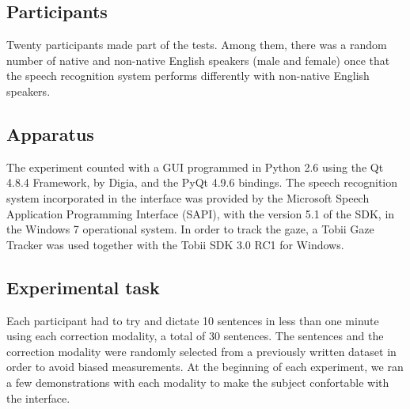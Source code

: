 \documentclass[]{article}
\begin{document}
\subsection{Participants}
Twenty participants made part of the tests. Among them, there was a random number of native and non-native English speakers (male and female) once that the speech recognition system performs differently with non-native English speakers.


\subsection{Apparatus}
The experiment counted with a GUI programmed in Python 2.6 using the Qt 4.8.4 Framework, by Digia, and the PyQt 4.9.6 bindings. The speech recognition system incorporated in the interface was provided by the Microsoft Speech Application Programming Interface (SAPI), with the version 5.1 of the SDK, in the Windows 7 operational system. In order to track the gaze, a Tobii Gaze Tracker was used together with the Tobii SDK 3.0 RC1 for Windows.


\subsection{Experimental task}
Each participant had to try and dictate 10 sentences in less than one minute using each correction modality, a total of 30 sentences. The sentences and the correction modality were randomly selected from a previously written dataset in order to avoid biased measurements. At the beginning of each experiment, we ran a few demonstrations with each modality to make the subject confortable with the interface.
\end{document}
